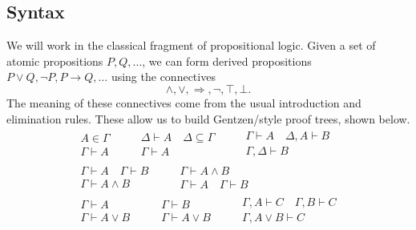 \documentclass[../main.tex]{subfiles}
\begin{document}
\subsection*{Syntax}

We will work in the classical fragment of propositional logic. Given a set of
atomic propositions \(P,Q,\ldots\), we can form derived propositions \(P \vee Q,
\neg P, P \to Q,\ldots\) using the connectives
\[%
  \wedge, \vee, \Rightarrow, \neg, \top, \bot.
\]%
The meaning of these connectives come from the usual introduction and
elimination rules. These allow us to build Gentzen\-/style proof trees, shown
below.
\begin{gather*}
  \begin{array}{c}
    A \in \Gamma \\\hline \Gamma \vdash A
  \end{array}\quad\quad
  \begin{array}{c}
    \Delta \vdash A \quad \Delta \subseteq \Gamma \\\hline \Gamma \vdash A
  \end{array}\quad\quad
  \begin{array}{c}
    \Gamma \vdash A \quad \Delta, A \vdash B\\\hline \Gamma,\Delta \vdash B
  \end{array}\\
  \begin{array}{c}
    \Gamma \vdash A \quad \Gamma \vdash B \\\hline \Gamma \vdash A \wedge B
  \end{array}\quad\quad
  \begin{array}{c}
    \Gamma \vdash A \wedge B \\\hline \Gamma \vdash A \quad \Gamma \vdash B
  \end{array}\\
  \begin{array}{c}
    \Gamma \vdash A \\\hline \Gamma \vdash A \vee B
  \end{array}\quad\quad
  \begin{array}{c}
    \Gamma \vdash B \\\hline \Gamma \vdash A \vee B
  \end{array}\quad\quad
  \begin{array}{c}
    \Gamma, A \vdash C \quad \Gamma, B \vdash C \\\hline \Gamma, A \vee B \vdash C
  \end{array}\\

\end{gather*}
\end{document}
